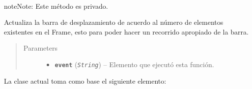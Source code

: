 \documentclass[class=report, crop=false]{standalone}
\begin{document}
\begin{fulllineitems}

\begin{fulllineitems}

~

\begin{notice}{note}{Note:}
Este método es privado.
\end{notice}

Actualiza la barra de desplazamiento de acuerdo al 
número de elementos existentes en el Frame, esto 
para poder hacer un recorrido apropiado de la barra.

\begin{quote}\begin{description}
\item[{Parameters}] \leavevmode\begin{itemize}
\item \textbf{\texttt{event}} (\emph{\texttt{String}}) -- Elemento que ejecutó esta función.
\end{itemize}
\end{description}\end{quote}

\end{fulllineitems}

\end{fulllineitems}

La clase actual toma como base el siguiente elemento:
\end{document}
